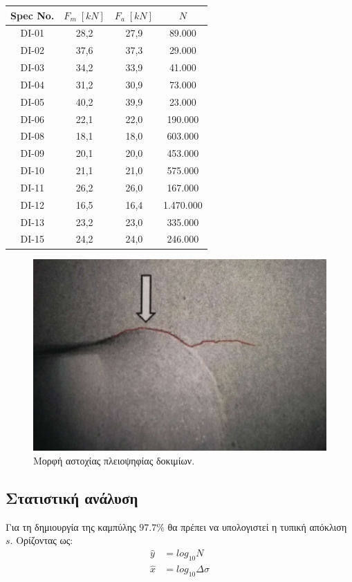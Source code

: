 \documentclass{article}
\begin{document}
\begin{table}[H]
    \centering
    \begin{tabular}{|c|c|c|c|}
        \hline
        \rowcolor{Dandelion}
        Spec No. & $F_m\; [kN]$ & $F_a\; [kN]$ & $N$\\
        \hline
        DI-01 & 28,2 & 27,9 & 89.000\\ \hline
        DI-02 & 37,6 & 37,3 & 29.000\\ \hline
        DI-03 & 34,2 & 33,9 & 41.000\\ \hline
        DI-04 & 31,2 & 30,9 & 73.000\\ \hline
        DI-05 & 40,2 & 39,9 & 23.000\\ \hline
        DI-06 & 22,1 & 22,0 & 190.000\\ \hline
        DI-08 & 18,1 & 18,0 & 603.000\\ \hline
        DI-09 & 20,1 & 20,0 & 453.000\\ \hline
        DI-10 & 21,1 & 21,0 & 575.000\\ \hline
        DI-11 & 26,2 & 26,0 & 167.000\\ \hline
        DI-12 & 16,5 & 16,4 & 1.470.000\\ \hline
        DI-13 & 23,2 & 23,0 & 335.000\\ \hline
        DI-15 & 24,2 & 24,0 & 246.000\\ \hline
    \end{tabular}
\end{table}

\begin{figure}[H]
    \centering
    \includegraphics[width=0.5\linewidth]{media/astoxia.png}
    \caption{Μορφή αστοχίας πλειοψηφίας δοκιμίων.}
    \label{fig:astoxia}
\end{figure}

\subsection{Στατιστική ανάλυση}
Για τη δημιουργία της καμπύλης $97.7\%$ θα πρέπει να υπολογιστεί η τυπική απόκλιση $s$. Ορίζοντας ως:
\begin{align}
    \hat{y} &= log_{10} N\\
    \hat{x} &= log_{10} \Delta \sigma
\end{align}
\end{document}
